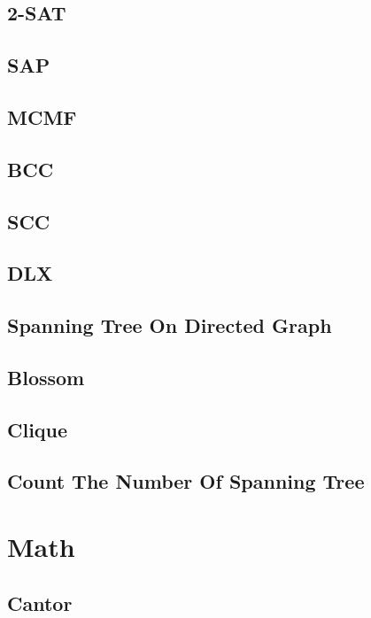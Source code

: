 \documentclass[twocolumn]{article}
\begin{document}
\subsection{2-SAT}

\subsection{SAP}

\subsection{MCMF}

\subsection{BCC}

\subsection{SCC}

\subsection{DLX}

\subsection{Spanning Tree On Directed Graph}

\subsection{Blossom}

\subsection{Clique}

\subsection{Count The Number Of Spanning Tree}

\section{Math}
\subsection{Cantor}

\end{document}
